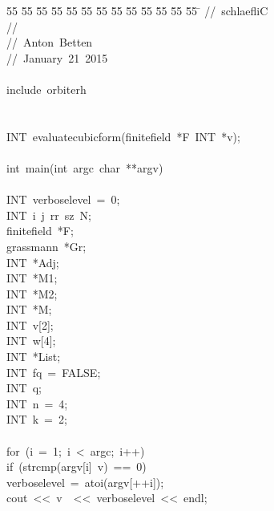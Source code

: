 %
%
\begin{tabbing}
55 \= 55 \= 55 \= 55 \= 55 \= 55 \= 55 \= 55 \= 55 \= 55 \= 55 \= 55 \= 55 \= \kill
//\ schlaefliC\\[0pt]
//\ \\[0pt]
//\ Anton\ Betten\\[0pt]
//\ January\ 21\ 2015\\[0pt]
\\[0pt]
include\ orbiterh\\[0pt]
\\[0pt]
\\[0pt]
INT\ evaluatecubicform(finitefield\ *F\ INT\ *v);\\[0pt]
\\[0pt]
int\ main(int\ argc\ char\ **argv)\\[0pt]
\\[0pt]
\>INT\ verboselevel\ =\ 0;\\[0pt]
\>INT\ i\ j\ rr\ sz\ N;\\[0pt]
\>finitefield\ *F;\\[0pt]
\>grassmann\ *Gr;\\[0pt]
\>INT\ *Adj;\\[0pt]
\>INT\ *M1;\\[0pt]
\>INT\ *M2;\\[0pt]
\>INT\ *M;\\[0pt]
\>INT\ v[2];\\[0pt]
\>INT\ w[4];\\[0pt]
\>INT\ *List;\\[0pt]
\>INT\ fq\ =\ FALSE;\\[0pt]
\>INT\ q;\\[0pt]
\>INT\ n\ =\ 4;\\[0pt]
\>INT\ k\ =\ 2;\\[0pt]
\\[0pt]
\>for\ (i\ =\ 1;\ i\ <\ argc;\ i++)\ \\[0pt]
\>\>if\ (strcmp(argv[i]\ v)\ ==\ 0)\ \\[0pt]
\>\>\>verboselevel\ =\ atoi(argv[++i]);\\[0pt]
\>\>\>cout\ <<\ v\ \ <<\ verboselevel\ <<\ endl;\\[0pt]
\>\>\>\\[0pt]

\end{tabbing}

